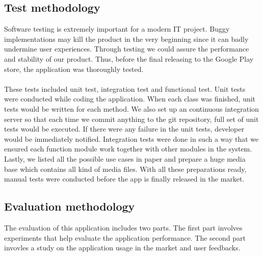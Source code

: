 \subsection{Test methodology}
Software testing is extremely important for a modern IT project. Buggy implementations may kill the product in the very beginning since it can badly undermine user experiences. Through testing we could assure the performance and stability of our product. Thus, before the final releasing to the Google Play store, the application was thoroughly tested.\\
\\
These tests included unit test, integration test and functional test.
Unit tests were conducted while coding the application. When each class was finished, unit tests would be written for each method. We also set up an continuous integration server so that each time we commit anything to the git repository, full set of unit tests would be executed. If there were any failure in the unit tests, developer would be immediately notified. Integration tests were done in such a way that we ensured each function module work together with other modules in the system. Lastly, we listed all the possible use cases in paper and prepare a huge media base which contains all kind of media files. With all these preparations ready, manual tests were conducted before the app is finally released in the market.

\subsection{Evaluation methodology}
The evaluation of this application includes two parts. The first part involves experiments
that help evaluate the application performance. The second part invovles a study on the application usage in the market and user feedbacks.

